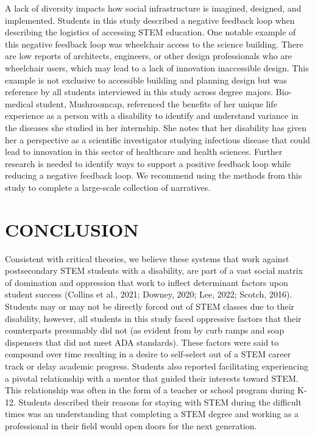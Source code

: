 \documentclass{sig-alternate} %
\begin{document}
\begin{large}
A lack of diversity impacts how social infrastructure is imagined, designed, and implemented. Students in this study described a negative feedback loop when describing the logistics of accessing STEM education. One notable example of this negative feedback loop was wheelchair access to the science building. There are low reports of architects, engineers, or other design professionals who are wheelchair users, which may lead to a lack of innovation inaccessible design. This example is not exclusive to accessible building and planning design but was reference by all students interviewed in this study across degree majors. Bio-medical student, Mushroomcap, referenced the benefits of her unique life experience as a person with a disability to identify and understand variance in the diseases she studied in her internship. She notes that her disability has given her a perspective as a scientific investigator studying infectious disease that could lead to innovation in this sector of healthcare and health sciences. Further research is needed to identify ways to support a positive feedback loop while reducing a negative feedback loop. We recommend using the methods from this study to complete a large-scale collection of narratives. 

\section*{CONCLUSION}

Consistent with critical theories, we believe these systems that work against postsecondary STEM students with a disability, are part of a vast social matrix of domination and oppression that work to inflect determinant factors upon student success (Collins et al., 2021; Downey, 2020; Lee, 2022; Scotch, 2016). Students may or may not be directly forced out of STEM classes due to their disability, however, all students in this study faced oppressive factors that their counterparts presumably did not (as evident from by curb ramps and soap dispensers that did not meet ADA standards). These factors were said to compound over time resulting in a desire to self-select out of a STEM career track or delay academic progress. Students also reported facilitating experiencing a pivotal relationship with a mentor that guided their interests toward STEM. This relationship was often in the form of a teacher or school program during K-12. Students described their reasons for staying with STEM during the difficult times was an understanding that completing a STEM degree and working as a professional in their field would open doors for the next generation.


\end{large}
\end{document}
